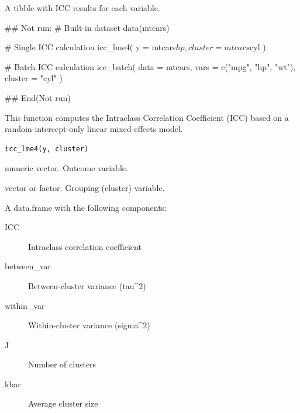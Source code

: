\documentclass[a4paper]{book}
\begin{document}
%
\begin{Value}
A tibble with ICC results for each variable.
\end{Value}
%
\begin{Examples}
\begin{ExampleCode}
## Not run: 
# Built-in dataset
data(mtcars)

# Single ICC calculation
icc_lme4(
  y = mtcars$hp,
  cluster = mtcars$cyl
)

# Batch ICC calculation
icc_batch(
  data = mtcars,
  vars = c("mpg", "hp", "wt"),
  cluster = "cyl"
)

## End(Not run)
\end{ExampleCode}
\end{Examples}
%
\begin{Description}
This function computes the Intraclass Correlation Coefficient (ICC)
based on a random-intercept-only linear mixed-effects model.
\end{Description}
%
\begin{Usage}
\begin{verbatim}
icc_lme4(y, cluster)
\end{verbatim}
\end{Usage}
%
\begin{Arguments}
\begin{ldescription}
\item[\code{y}] numeric vector. Outcome variable.

\item[\code{cluster}] vector or factor. Grouping (cluster) variable.
\end{ldescription}
\end{Arguments}
%
\begin{Value}
A data.frame with the following components:
\begin{description}

\item[ICC] Intraclass correlation coefficient
\item[between\_var] Between-cluster variance (tau\textasciicircum{}2)
\item[within\_var] Within-cluster variance (sigma\textasciicircum{}2)
\item[J] Number of clusters
\item[kbar] Average cluster size

\end{description}

\end{Value}
\end{document}
